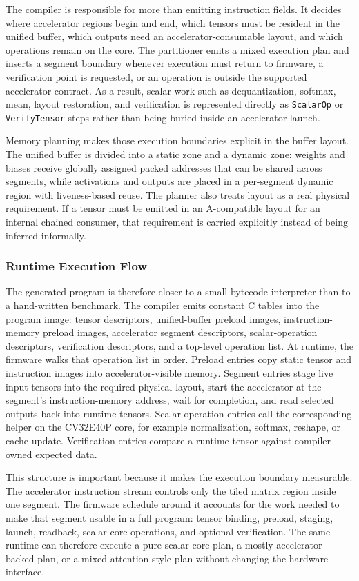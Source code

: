 \documentclass[a4paper, 12pt, titlepage]{article}
\begin{document}
The compiler is responsible for more than emitting instruction fields. It decides where accelerator regions begin and end, which tensors must be resident in the unified buffer, which outputs need an accelerator-consumable layout, and which operations remain on the core. The partitioner emits a mixed execution plan and inserts a segment boundary whenever execution must return to firmware, a verification point is requested, or an operation is outside the supported accelerator contract. As a result, scalar work such as dequantization, softmax, mean, layout restoration, and verification is represented directly as \texttt{ScalarOp} or \texttt{VerifyTensor} steps rather than being buried inside an accelerator launch.

Memory planning makes those execution boundaries explicit in the buffer layout. The unified buffer is divided into a static zone and a dynamic zone: weights and biases receive globally assigned packed addresses that can be shared across segments, while activations and outputs are placed in a per-segment dynamic region with liveness-based reuse. The planner also treats layout as a real physical requirement. If a tensor must be emitted in an A-compatible layout for an internal chained consumer, that requirement is carried explicitly instead of being inferred informally.

\subsubsection{Runtime Execution Flow}
The generated program is therefore closer to a small bytecode interpreter than to a hand-written benchmark. The compiler emits constant C tables into the program image: tensor descriptors, unified-buffer preload images, instruction-memory preload images, accelerator segment descriptors, scalar-operation descriptors, verification descriptors, and a top-level operation list. At runtime, the firmware walks that operation list in order. Preload entries copy static tensor and instruction images into accelerator-visible memory. Segment entries stage live input tensors into the required physical layout, start the accelerator at the segment's instruction-memory address, wait for completion, and read selected outputs back into runtime tensors. Scalar-operation entries call the corresponding helper on the CV32E40P core, for example normalization, softmax, reshape, or cache update. Verification entries compare a runtime tensor against compiler-owned expected data.

This structure is important because it makes the execution boundary measurable. The accelerator instruction stream controls only the tiled matrix region inside one segment. The firmware schedule around it accounts for the work needed to make that segment usable in a full program: tensor binding, preload, staging, launch, readback, scalar core operations, and optional verification. The same runtime can therefore execute a pure scalar-core plan, a mostly accelerator-backed plan, or a mixed attention-style plan without changing the hardware interface.
\end{document}

